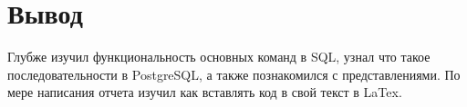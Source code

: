 \section{Вывод}
Глубже изучил функциональность основных команд в SQL, узнал что такое последовательности в PostgreSQL, а также познакомился с представлениями. По мере написания отчета изучил как вставлять код в свой текст в LaTex.